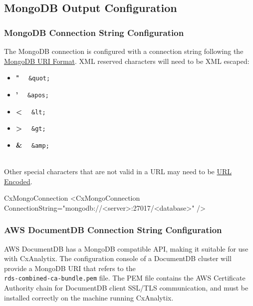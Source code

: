\subsection{MongoDB Output Configuration}\label{sec:mongo_config}


\subsubsection{MongoDB Connection String Configuration}

The MongoDB connection is configured with a connection string following the \href{https://docs.mongodb.com/manual/reference/connection-string/}{MongoDB URI Format}.
XML reserved characters will need to be XML escaped:

\begin{itemize}
    \item \textbf{"} \ \faArrowRight \ \texttt{\&quot;}
    \item \textbf{'} \ \faArrowRight \ \texttt{\&apos;}
    \item \textbf{<} \ \faArrowRight \ \texttt{\&lt;}
    \item \textbf{>} \ \faArrowRight \ \texttt{\&gt;}
    \item \textbf{\&} \ \faArrowRight \ \texttt{\&amp;}
\end{itemize}

\noindent\\Other special characters that are not valid in a URL may need to be \href{https://www.w3schools.com/tags/ref_urlencode.ASP}{URL Encoded}.\\

\begin{xml}{CxMongoConnection}{\expandsenv\encrypts}{}
<CxMongoConnection
    ConnectionString="mongodb://<server>:27017/<database>"
/>
\end{xml}


\subsubsection{AWS DocumentDB Connection String Configuration}

AWS DocumentDB has a MongoDB compatible API, making it suitable for
use with CxAnalytix.  The configuration console of a DocumentDB cluster will
provide a MongoDB URI that refers to the\\\texttt{rds-combined-ca-bundle.pem}
file.  The PEM file contains the AWS Certificate Authority chain for 
DocumentDB client SSL/TLS
communication, and must be installed correctly on the machine running
CxAnalytix.

